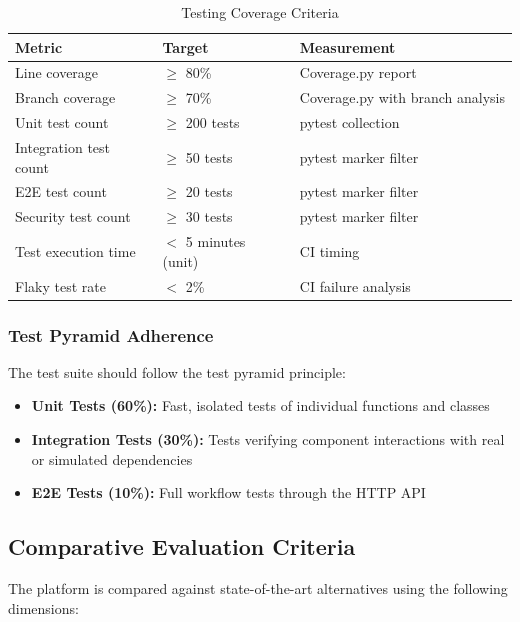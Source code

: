 \documentclass[a4paper,twoside]{sapthesis}
\begin{document}
\begin{table}[htbp]
\centering
\caption{Testing Coverage Criteria}
\label{tab:testing-eval}
\small
\begin{tabularx}{\textwidth}{|l|l|X|}
\hline
\textbf{Metric} & \textbf{Target} & \textbf{Measurement} \\
\midrule
Line coverage & $\geq$ 80\% & Coverage.py report \\
\midrule
Branch coverage & $\geq$ 70\% & Coverage.py with branch analysis \\
\midrule
Unit test count & $\geq$ 200 tests & pytest collection \\
\midrule
Integration test count & $\geq$ 50 tests & pytest marker filter \\
\midrule
E2E test count & $\geq$ 20 tests & pytest marker filter \\
\midrule
Security test count & $\geq$ 30 tests & pytest marker filter \\
\midrule
Test execution time & $<$ 5 minutes (unit) & CI timing \\
\midrule
Flaky test rate & $<$ 2\% & CI failure analysis \\
\midrule
\end{tabularx}
\end{table}

\subsubsection{Test Pyramid Adherence}

The test suite should follow the test pyramid principle:
\begin{itemize}
    \item \textbf{Unit Tests (60\%):} Fast, isolated tests of individual functions and classes
    \item \textbf{Integration Tests (30\%):} Tests verifying component interactions with real or simulated dependencies
    \item \textbf{E2E Tests (10\%):} Full workflow tests through the HTTP API
\end{itemize}

\subsection{Comparative Evaluation Criteria}
\label{subsec:comparative-criteria}

The platform is compared against state-of-the-art alternatives using the following dimensions:
\end{document}
